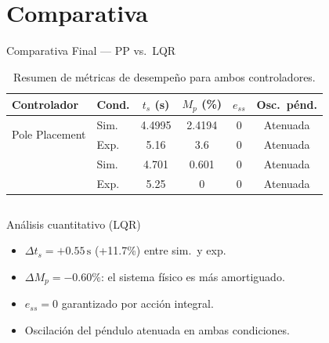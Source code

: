 \documentclass[mathserif,spanish,10pt]{beamer}
\begin{document}
\section{Comparativa}

\begin{frame}{Comparativa Final — PP vs.\ LQR}

\begin{table}
    \centering
    \caption{Resumen de métricas de desempeño para ambos controladores.}
    \label{tab:comparativa}
    \small
    \begin{tabular}{llcccc}
      \hline
      \rowcolor{rowhdr}
      \color{white}\textbf{Controlador} &
      \color{white}\textbf{Cond.} &
      \color{white}$t_s$ (s) &
      \color{white}$M_p$ (\%) &
      \color{white}$e_{ss}$ &
      \color{white}Osc.\ pénd. \\
      \hline
      \multirow{2}{*}{Pole Placement} & Sim. & 4.4995 & 2.4194 & 0 & Atenuada \\
                                      & Exp. & 5.16   & 3.6    & 0 & Atenuada \\
      \hline
      \rowcolor{rowsim}
                                      & Sim. & 4.701  & 0.601  & 0 & Atenuada \\
      \rowcolor{rowsim}
      \multirow{-2}{*}{LQR}           & Exp. & 5.25   & 0      & 0 & Atenuada \\
      \hline
    \end{tabular}
  \end{table}

  \vspace{4pt}
  \begin{columns}[T]
    \begin{block}{Análisis cuantitativo (LQR)}
      \scriptsize
      \begin{itemize}
        \item $\Delta t_s = +0.55\,\text{s}$ (+11.7\%) entre sim.\ y exp.
        \item $\Delta M_p = -0.60\%$: el sistema físico es más amortiguado.
        \item $e_{ss} = 0$ garantizado por acción integral.
        \item Oscilación del péndulo atenuada en ambas condiciones.
      \end{itemize}
    \end{block}


\end{columns}
\end{frame}
\end{document}
